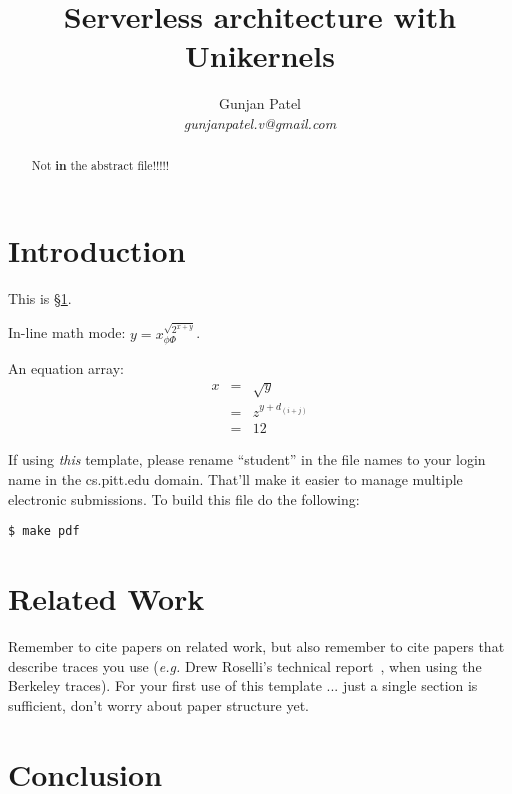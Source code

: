 \documentclass[10pt]{article}
\begin{document}
\title{Serverless architecture with Unikernels}

\author{ 
Gunjan Patel\\
{\it gunjanpatel.v@gmail.com}
}

\maketitle

\begin{abstract}
{\it


Not {\bf in} the abstract file!!!!!

}
\end{abstract}

\section{Introduction}
\label{sec:intro}

This is \S\ref{sec:intro}.


\noindent In-line math mode: $y = x^{\sqrt{2^{x+y}}}_{\phi \Phi}$.

An equation array:
\begin{eqnarray}
x & = & \sqrt{y} \\
  & = & z^{y+d_{(i+j)}} \nonumber \\
  & = & 12
\end{eqnarray}

If using {\em this} template, please rename ``student'' in the file names
to your login name in the cs.pitt.edu domain. That'll make it easier to manage
multiple electronic submissions.
To build this file do the following:
\begin{verbatim}
$ make pdf
\end{verbatim}


\section{Related Work}
\label{sec:related}


Remember to cite papers on related work, but also remember
to cite papers that describe traces you use ({\it e.g.} 
Drew Roselli's technical report~\cite{roselli98}, when using 
the Berkeley traces). For your first use of this template ... just
a single section is sufficient, don't worry about paper structure yet.



\section{Conclusion}
\label{sec:conclusion}





\end{document}
